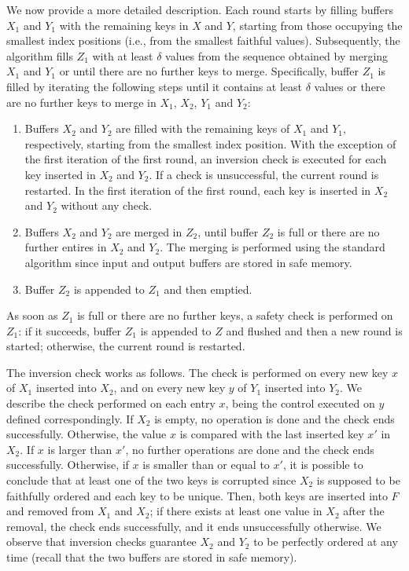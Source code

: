 \documentclass[review,number]{elsarticle}
\newcommand{\X}{{X}}
\newcommand{\Y}{{Y}}
\newcommand{\Z}{{Z}}
\newcommand{\F}{{F}}
\begin{document}
We now provide a more detailed description. Each round starts by filling buffers
$\X_1$ and $\Y_1$ with the remaining keys in $X$ and $Y$, starting from those
occupying the smallest index positions (i.e., from the smallest faithful
values). Subsequently, the algorithm fills $\Z_1$ with at least $\delta$ values
from the sequence obtained by merging $\X_1$ and $\Y_1$ or until there are no
further keys to merge. Specifically, buffer $\Z_1$ is
filled by iterating the following steps until it contains at least $\delta$
values  or there are no further keys to merge in $\X_1$, $\X_2$, $\Y_1$ and
$\Y_2$:
\begin{enumerate}
\item Buffers $\X_2$ and $\Y_2$ are filled with the remaining keys of
$\X_1$ and $\Y_1$, respectively, starting from the smallest index position. With
the exception of the first iteration of the first round, an  inversion check is
executed for each key inserted in $\X_2$ and $\Y_2$. If a
check is unsuccessful, the current round is restarted. In the first iteration of
the first round, each key is inserted in $\X_2$ and $\Y_2$  without any check.

\item Buffers $\X_2$ and $\Y_2$ are merged in $\Z_2$, until buffer $\Z_2$ is
full or there are no further entires in $\X_2$ and $\Y_2$. 
The merging is performed using the standard algorithm since input and
output buffers are stored in safe memory.

\item Buffer $\Z_2$ is appended to $\Z_1$ and then emptied.
\end{enumerate}

As soon as $\Z_1$ is full or there are no further keys, a safety check is
performed on $\Z_1$: if it succeeds,  buffer $\Z_1$ is appended to $Z$ and
flushed and then a new round is started; otherwise, the current round is
restarted. 

The inversion check works as follows. The check is performed on every new key
$x$ of $\X_1$ inserted into $\X_2$, and on every new key $y$ of $\Y_1$ inserted
into $\Y_2$. 
We describe the check performed on each entry $x$, being the control executed
on $y$ defined correspondingly. 
If $\X_2$ is empty, no operation is done and the check ends successfully.
Otherwise, the value $x$ is compared with the last inserted key $x'$ in $\X_2$.
If $x$ is larger than $x'$, no further operations are done and the check ends
successfully. Otherwise, if $x$ is smaller than or equal to $x'$, it is possible
to conclude that at least one of the two keys is corrupted since $\X_2$ is
supposed to be faithfully ordered and each key to be unique. Then, both keys are
inserted into $\F$ and removed from $\X_1$ and $\X_2$; if there exists at least
one value in $\X_2$ after the removal, the check ends successfully, and it
ends unsuccessfully otherwise. We observe that inversion
checks guarantee $\X_2$ and $\Y_2$ to be perfectly ordered at any time (recall
that the two buffers are stored in safe memory).
\end{document}
